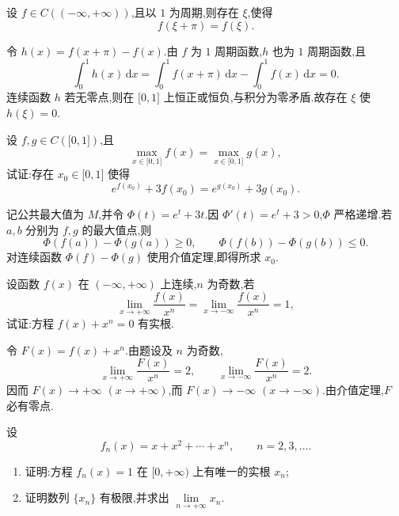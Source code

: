 \begin{example}
    设 $f\in C(( -\infty,+\infty))$,且以 $1$ 为周期,则存在 $\xi$,使得
    \[
        f(\xi+\pi)=f(\xi).
    \]
\end{example}
\exampleblank

\begin{solution}
    令 $h(x)=f(x+\pi)-f(x)$.由 $f$ 为 $1$ 周期函数,$h$ 也为 $1$ 周期函数,且
    \[
        \int_0^1h(x)\,\mathrm{d}x
        =\int_0^1f(x+\pi)\,\mathrm{d}x-\int_0^1f(x)\,\mathrm{d}x=0.
    \]
    连续函数 $h$ 若无零点,则在 $\lbrack0,1\rbrack$ 上恒正或恒负,与积分为零矛盾.故存在 $\xi$ 使 $h(\xi)=0$.
\end{solution}

\begin{example}
    设 $f,g\in C(\lbrack 0,1\rbrack)$,且
    \[
        \max\limits_{x\in\lbrack 0,1\rbrack}f(x)=\max\limits_{x\in\lbrack 0,1\rbrack}g(x),
    \]
    试证:存在 $x_0\in\lbrack 0,1\rbrack$ 使得
    \[
        e^{f(x_0)}+3f(x_0)=e^{g(x_0)}+3g(x_0).
    \]
\end{example}
\exampleblank

\begin{solution}
    记公共最大值为 $M$,并令 $\Phi(t)=e^t+3t$.因 $\Phi'(t)=e^t+3>0$,$\Phi$ 严格递增.若 $a,b$ 分别为 $f,g$ 的最大值点,则
    \[
        \Phi(f(a))-\Phi(g(a))\geq0,
        \qquad
        \Phi(f(b))-\Phi(g(b))\leq0.
    \]
    对连续函数 $\Phi(f)-\Phi(g)$ 使用介值定理,即得所求 $x_0$.
\end{solution}

\begin{example}
    设函数 $f(x)$ 在 $(-\infty,+\infty)$ 上连续,$n$ 为奇数,若
    \[
        \lim\limits_{x\to+\infty}\dfrac{f(x)}{x^n}
        =\lim\limits_{x\to-\infty}\dfrac{f(x)}{x^n}=1,
    \]
    试证:方程 $f(x)+x^n=0$ 有实根.
\end{example}
\exampleblank

\begin{solution}
    令 $F(x)=f(x)+x^n$.由题设及 $n$ 为奇数,
    \[
        \lim\limits_{x\to+\infty}\dfrac{F(x)}{x^n}=2,
        \qquad
        \lim\limits_{x\to-\infty}\dfrac{F(x)}{x^n}=2.
    \]
    因而 $F(x)\to+\infty$ $(x\to+\infty)$,而 $F(x)\to-\infty$ $(x\to-\infty)$.由介值定理,$F$ 必有零点.
\end{solution}

\begin{example}
    设
    \[
        f_n(x)=x+x^2+\cdots+x^n,
        \qquad n=2,3,\ldots.
    \]
    \begin{enumerate}
        \item 证明:方程 $f_n(x)=1$ 在 $\lbrack 0,+\infty)$ 上有唯一的实根 $x_n$;
        \item 证明数列 $\{x_n\}$ 有极限,并求出 $\displaystyle\lim\limits_{n\to+\infty}x_n$.
    \end{enumerate}
\end{example}
\exampleblank

